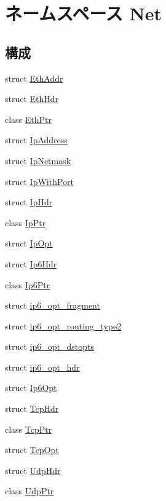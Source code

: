 \hypertarget{namespaceNet}{
\section{ネームスペース Net}
\label{namespaceNet}
}
\subsection*{構成}
\begin{DoxyCompactItemize}
\item 
struct \hyperlink{structNet_1_1EthAddr}{EthAddr}
\item 
struct \hyperlink{structNet_1_1EthHdr}{EthHdr}
\item 
class \hyperlink{classNet_1_1EthPtr}{EthPtr}
\item 
struct \hyperlink{structNet_1_1IpAddress}{IpAddress}
\item 
struct \hyperlink{structNet_1_1IpNetmask}{IpNetmask}
\item 
struct \hyperlink{structNet_1_1IpWithPort}{IpWithPort}
\item 
struct \hyperlink{structNet_1_1IpHdr}{IpHdr}
\item 
class \hyperlink{classNet_1_1IpPtr}{IpPtr}
\item 
struct \hyperlink{structNet_1_1IpOpt}{IpOpt}
\item 
struct \hyperlink{structNet_1_1Ip6Hdr}{Ip6Hdr}
\item 
class \hyperlink{classNet_1_1Ip6Ptr}{Ip6Ptr}
\item 
struct \hyperlink{structNet_1_1ip6__opt__fragment}{ip6\_\-opt\_\-fragment}
\item 
struct \hyperlink{structNet_1_1ip6__opt__routing__type2}{ip6\_\-opt\_\-routing\_\-type2}
\item 
struct \hyperlink{structNet_1_1ip6__opt__dstopts}{ip6\_\-opt\_\-dstopts}
\item 
struct \hyperlink{structNet_1_1ip6__opt__hdr}{ip6\_\-opt\_\-hdr}
\item 
struct \hyperlink{structNet_1_1Ip6Opt}{Ip6Opt}
\item 
struct \hyperlink{structNet_1_1TcpHdr}{TcpHdr}
\item 
class \hyperlink{classNet_1_1TcpPtr}{TcpPtr}
\item 
struct \hyperlink{structNet_1_1TcpOpt}{TcpOpt}
\item 
struct \hyperlink{structNet_1_1UdpHdr}{UdpHdr}
\item 
class \hyperlink{classNet_1_1UdpPtr}{UdpPtr}
\end{DoxyCompactItemize}
